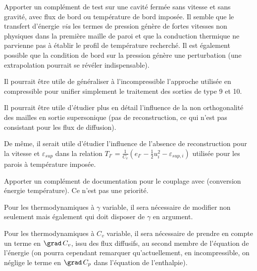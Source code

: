 Apporter un compl\'ement de test sur une cavit\'e ferm\'ee
sans vitesse et sans gravit\'e, avec flux de bord ou temp\'erature de bord impos\'ee.
Il semble que le transfert d'\'energie {\it via} les termes de pression g\'en\`ere de
fortes vitesses non physiques dans la premi\`ere maille de paroi et que la
conduction thermique ne parvienne pas \`a \'etablir le profil de temp\'erature
recherch\'e. Il est \'egalement possible que la condition de bord sur la pression
g\'en\`ere une perturbation (une extrapolation pourrait se r\'ev\'eler
indispensable).

Il pourrait \^etre utile de g\'en\'eraliser \`a l'incompressible l'approche
utilis\'ee en compressible pour unifier simplement le traitement
des sorties de type 9 et 10.

Il pourrait \^etre utile d'\'etudier plus en d\'etail l'influence de la non
orthogonalit\'e des mailles en sortie supersonique (pas de reconstruction,
ce qui n'est pas consistant pour les flux de diffusion).

De m\^eme, il serait utile d'\'etudier l'influence de l'absence de
reconstruction pour la vitesse et $\varepsilon_{sup}$ dans la relation
$\displaystyle T_{I'}=\frac{1}{C_v}\left(e_{I'}-\frac{1}{2}u^2_{i}-\varepsilon_{sup,i}\right)$
utilis\'ee pour les parois \`a temp\'erature impos\'ee.

Apporter un compl\'ement de documentation pour le couplage avec \syrthes (conversion
\'energie temp\'erature). Ce n'est pas une priorit\'e.

Pour les thermodynamiques \`a $\gamma$ variable, il sera n\'ecessaire de
modifier non
seulement  mais \'egalement  qui doit disposer de
$\gamma$ en argument.

Pour les thermodynamiques \`a $C_v$ variable, il sera n\'ecessaire de
prendre en compte un terme en $\grad\,C_v$, issu des flux diffusifs,
au second membre de l'\'equation de
l'\'energie (on pourra cependant remarquer qu'actuellement, en incompressible,
on n\'eglige le terme en $\grad\,C_p$ dans l'\'equation de l'enthalpie).
